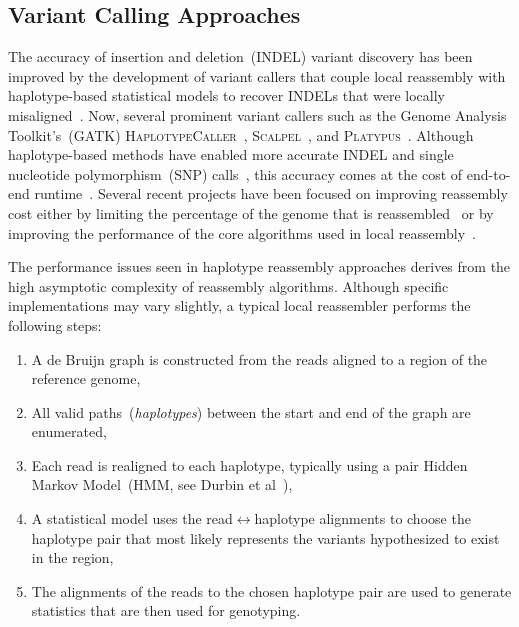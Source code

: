 \documentclass[phd]{ucbthesis}
\begin{document}
\subsection{Variant Calling Approaches}
\label{sec:variant-calling-approaches}

The accuracy of insertion and deletion~(INDEL) variant discovery has been improved by the development
of variant callers that couple local reassembly with haplotype-based statistical models to recover INDELs
that were locally misaligned~\cite{albers11}. Now, several prominent variant callers such as the Genome
Analysis Toolkit's~(GATK) \textsc{HaplotypeCaller}~\cite{depristo11}, \textsc{Scalpel}~\cite{narzisi14}, and
\textsc{Platypus}~\cite{rimmer14}. Although haplotype-based methods have enabled more accurate INDEL
and single nucleotide polymorphism~(SNP) calls~\cite{bao14}, this accuracy comes at the cost of
end-to-end runtime~\cite{talwalkar14}. Several recent projects have been focused on improving
reassembly cost either by limiting the percentage of the genome that is reassembled~\cite{bloniarz14} or
by improving the performance of the core algorithms used in local reassembly~\cite{rimmer14}.

The performance issues seen in haplotype reassembly approaches derives from the high asymptotic
complexity of reassembly algorithms. Although specific implementations may vary slightly, a typical
local reassembler performs the following steps:

\begin{enumerate}
\item A de Bruijn graph is constructed from the reads aligned to a region of the reference genome,
\item All valid paths~(\emph{haplotypes}) between the start and end of the graph are enumerated,
\item Each read is realigned to each haplotype, typically using a pair Hidden Markov Model~(HMM,
see Durbin et al~\cite{durbin98}),
\item A statistical model uses the read$\leftrightarrow$haplotype alignments to choose the haplotype pair
that most likely represents the variants hypothesized to exist in the region, 
\item The alignments of the reads to the chosen haplotype pair are used to generate statistics that are
then used for genotyping.
\end{enumerate}
\end{document}
